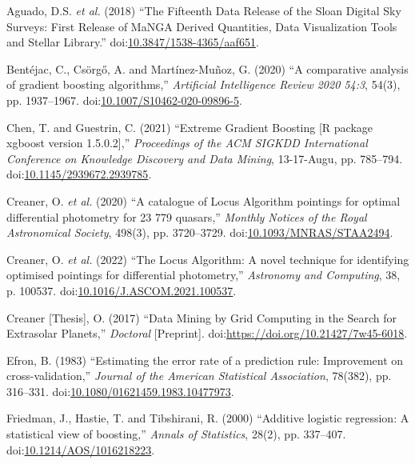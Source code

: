 \documentclass[a4paper,fleqn,usenatbib]{mnras}
\newlength{\cslhangindent}
\newlength{\cslentryspacingunit} %
\newenvironment{CSLReferences}[2] %
 {%
  \setlength{\parindent}{0pt}
  \ifodd #1
  \let\oldpar\par
  \def\par{\hangindent=\cslhangindent\oldpar}
  \fi
  \setlength{\parskip}{#2\cslentryspacingunit}
 }%
 {}
\begin{document}
\hypertarget{refs}{}
\begin{CSLReferences}{0}{0}
\leavevmode{}%
Aguado, D.S. \emph{et al.} (2018) {``{The Fifteenth Data Release of the
Sloan Digital Sky Surveys: First Release of MaNGA Derived Quantities,
Data Visualization Tools and Stellar Library}.''}
doi:\href{https://doi.org/10.3847/1538-4365/aaf651}{10.3847/1538-4365/aaf651}.

\leavevmode{}%
Bentéjac, C., Csörgő, A. and Martínez-Muñoz, G. (2020) {``{A comparative
analysis of gradient boosting algorithms},''} \emph{Artificial
Intelligence Review 2020 54:3}, 54(3), pp. 1937--1967.
doi:\href{https://doi.org/10.1007/S10462-020-09896-5}{10.1007/S10462-020-09896-5}.

\leavevmode{}%
Chen, T. and Guestrin, C. (2021) {``{Extreme Gradient Boosting {[}R
package xgboost version 1.5.0.2{]}},''} \emph{Proceedings of the ACM
SIGKDD International Conference on Knowledge Discovery and Data Mining},
13-17-Augu, pp. 785--794.
doi:\href{https://doi.org/10.1145/2939672.2939785}{10.1145/2939672.2939785}.

\leavevmode{}%
Creaner, O. \emph{et al.} (2020) {``{A catalogue of Locus Algorithm
pointings for optimal differential photometry for 23 779 quasars},''}
\emph{Monthly Notices of the Royal Astronomical Society}, 498(3), pp.
3720--3729.
doi:\href{https://doi.org/10.1093/MNRAS/STAA2494}{10.1093/MNRAS/STAA2494}.

\leavevmode{}%
Creaner, O. \emph{et al.} (2022) {``{The Locus Algorithm: A novel
technique for identifying optimised pointings for differential
photometry},''} \emph{Astronomy and Computing}, 38, p. 100537.
doi:\href{https://doi.org/10.1016/J.ASCOM.2021.100537}{10.1016/J.ASCOM.2021.100537}.

\leavevmode{}%
Creaner {[}Thesis{]}, O. (2017) {``{Data Mining by Grid Computing in the
Search for Extrasolar Planets},''} \emph{Doctoral} {[}Preprint{]}.
doi:\url{https://doi.org/10.21427/7w45-6018}.

\leavevmode{}%
Efron, B. (1983) {``{Estimating the error rate of a prediction rule:
Improvement on cross-validation},''} \emph{Journal of the American
Statistical Association}, 78(382), pp. 316--331.
doi:\href{https://doi.org/10.1080/01621459.1983.10477973}{10.1080/01621459.1983.10477973}.

\leavevmode{}%
Friedman, J., Hastie, T. and Tibshirani, R. (2000) {``{Additive logistic
regression: A statistical view of boosting},''} \emph{Annals of
Statistics}, 28(2), pp. 337--407.
doi:\href{https://doi.org/10.1214/AOS/1016218223}{10.1214/AOS/1016218223}.

\end{CSLReferences}
\end{document}
